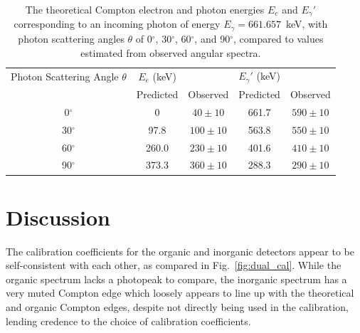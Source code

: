\documentclass[12pt]{article}
\newcommand{\figref}[1]{Fig.~\ref{#1}}
\newcommand{\degr}{$^\circ$\xspace}
\begin{document}
\begin{table}[!htb]
    \centering
    \caption{The theoretical Compton electron and photon energies $E_e$ and $E_\gamma'$ corresponding to an incoming photon of energy $E_\gamma=661.657$~keV, with photon scattering angles $\theta$ of 0\degr, 30\degr, 60\degr, and 90\degr, compared to values estimated from observed angular spectra.}
    \label{tab:comp_E}
    \begin{tabular}{c|cc|cc}
        Photon Scattering Angle $\theta$ & $E_e$ (keV) & & $E_\gamma'$ (keV) & \\
         & Predicted & Observed & Predicted & Observed\\\hline
        0\degr & 0 & $40\pm10$ & 661.7 & $590\pm10$ \\
        30\degr & 97.8 & $100\pm10$ & 563.8 & $550\pm10$\\
        60\degr & 260.0 & $230\pm10$ & 401.6 & $410\pm10$\\
        90\degr & 373.3 & $360\pm10$ & 288.3 & $290\pm10$
    \end{tabular}
\end{table}

\FloatBarrier
\section{Discussion}\label{sec:disc}



The calibration coefficients for the organic and inorganic detectors appear to be self-consistent with each other, as compared in \figref{fig:dual_cal}.
While the organic spectrum lacks a photopeak to compare, the inorganic spectrum has a very muted Compton edge which loosely appears to line up with the theoretical and organic Compton edges, despite not directly being used in the calibration, lending credence to the choice of calibration coefficients.\\
\end{document}
